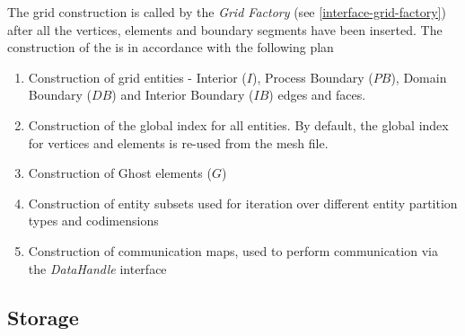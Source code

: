 
The grid construction is called by the \textit{Grid Factory} (see \ref{interface-grid-factory}) after all the vertices, elements and boundary segments have been inserted. The construction of the \curvgrid{} is in accordance with the following plan

\begin{mybox}
\begin{enumerate}
	\item Construction of grid entities - Interior ($I$), Process Boundary ($PB$), Domain Boundary ($DB$) and Interior Boundary ($IB$) edges and faces.
	\item Construction of the global index for all entities. By default, the global index for vertices and elements is re-used from the mesh file.
	\item Construction of Ghost elements ($G$)
	\item Construction of entity subsets used for iteration over different entity partition types and codimensions
	\item Construction of communication maps, used to perform communication via the \textit{DataHandle} interface
\end{enumerate}
\end{mybox}


\subsection{Storage}
\label{impl-grid-storage}

